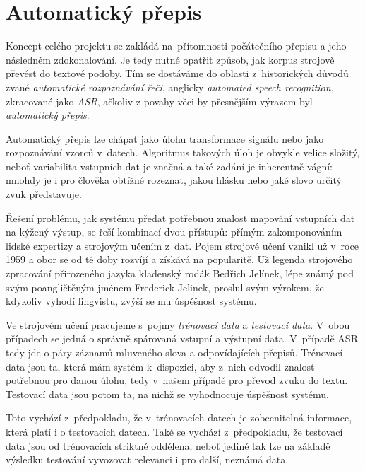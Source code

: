 \chapter{Automatický přepis}
\label{kap:asr}




Koncept celého projektu se zakládá na~přítomnosti počátečního přepisu a jeho
následném zdokonalování.
Je tedy nutné opatřit způsob, jak korpus strojově převést do textové podoby. Tím
se dostáváme do oblasti z~historických důvodů zvané \textit{automatické
rozpoznávání řeči}, anglicky \textit{automated speech recognition}, zkracované
jako \textit{ASR}, ačkoliv z povahy věci by přesnějším výrazem byl
\textit{automatický přepis}.

Automatický přepis lze chápat jako úlohu transformace signálu nebo jako
rozpoznávání vzorců v~datech. Algoritmus takových úloh je obvykle velice
složitý, neboť variabilita vstupních dat je značná a také zadání je inherentně
vágní: mnohdy je i pro člověka obtížné rozeznat, jakou hlásku nebo jaké slovo
určitý zvuk představuje.

Řešení problému, jak systému předat potřebnou znalost mapování vstupních dat na
kýžený výstup, se řeší kombinací dvou přístupů: přímým zakomponováním lidské
expertizy a strojovým učením z~dat. Pojem strojové učení vznikl už v~roce
1959\cite{samuel1959some} a obor se od té doby rozvíjí a získává na popularitě.
Už legenda strojového zpracování přirozeného jazyka kladenský rodák Bedřich
Jelínek, lépe známý pod svým poangličtěným jménem Frederick Jelinek, proslul
svým výrokem, že kdykoliv vyhodí lingvistu, zvýší se mu úspěšnost systému.

Ve strojovém učení pracujeme s~pojmy \textit{trénovací data} a \textit{testovací
data}. V~obou případech se jedná o správně spárovaná vstupní a výstupní data.
V~případě ASR tedy jde o páry záznamů mluveného slova a odpovídajících přepisů.
Trénovací data jsou ta, která mám systém k~dispozici, aby z~nich odvodil znalost
potřebnou pro danou úlohu, tedy v~našem případě pro převod zvuku do textu.
Testovací data jsou potom ta, na nichž se vyhodnocuje úspěšnost systému.

Toto vychází z~předpokladu, že v~trénovacích datech je zobecnitelná informace,
která platí i o testovacích datech. Také se vychází z~předpokladu, že testovací
data jsou od trénovacích striktně oddělena, neboť jedině tak lze na základě
výsledku testování vyvozovat relevanci i pro další, neznámá data.

